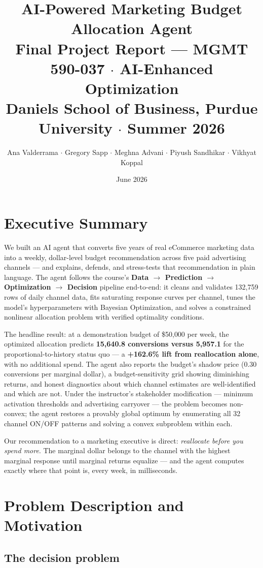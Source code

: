 \documentclass[11pt]{article}
\title{AI-Powered Marketing Budget Allocation Agent\\
\large Final Project Report --- MGMT 590-037 $\cdot$ AI-Enhanced Optimization\\
Daniels School of Business, Purdue University $\cdot$ Summer 2026}
\author{Ana Valderrama $\cdot$ Gregory Sapp $\cdot$ Meghna Advani $\cdot$ Piyush Sandhikar $\cdot$ Vikhyat Koppal}
\date{June 2026}
\begin{document}
\maketitle

\section*{Executive Summary}

We built an AI agent that converts five years of real eCommerce marketing data into a weekly, dollar-level budget recommendation across five paid advertising channels --- and explains, defends, and stress-tests that recommendation in plain language. The agent follows the course's \textbf{Data $\rightarrow$ Prediction $\rightarrow$ Optimization $\rightarrow$ Decision} pipeline end-to-end: it cleans and validates 132{,}759 rows of daily channel data, fits saturating response curves per channel, tunes the model's hyperparameters with Bayesian Optimization, and solves a constrained nonlinear allocation problem with verified optimality conditions.

The headline result: at a demonstration budget of \$50{,}000 per week, the optimized allocation predicts \textbf{15{,}640.8 conversions versus 5{,}957.1} for the proportional-to-history status quo --- a \textbf{+162.6\% lift from reallocation alone}, with no additional spend. The agent also reports the budget's shadow price (0.30 conversions per marginal dollar), a budget-sensitivity grid showing diminishing returns, and honest diagnostics about which channel estimates are well-identified and which are not. Under the instructor's stakeholder modification --- minimum activation thresholds and advertising carryover --- the problem becomes non-convex; the agent restores a provably global optimum by enumerating all 32 channel ON/OFF patterns and solving a convex subproblem within each.

Our recommendation to a marketing executive is direct: \emph{reallocate before you spend more}. The marginal dollar belongs to the channel with the highest marginal response until marginal returns equalize --- and the agent computes exactly where that point is, every week, in milliseconds.

\section{Problem Description and Motivation}

\subsection{The decision problem}
\end{document}
